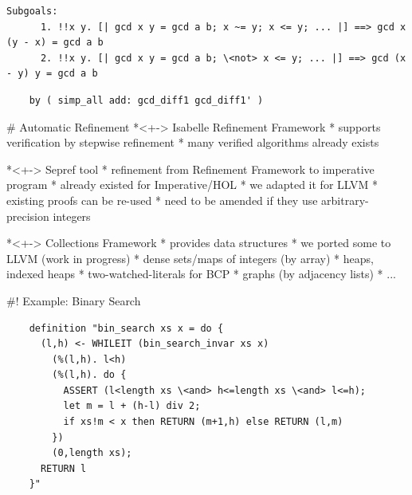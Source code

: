 \documentclass[fleqn]{beamer}
\begin{document}
  {\everymath{\color{darkgray}}
  \begin{lstlisting}[basicstyle=\color{darkgray}]
    Subgoals:
      1. !!x y. [| gcd x y = gcd a b; x ~= y; x <= y; ... |] ==> gcd x (y - x) = gcd a b
      2. !!x y. [| gcd x y = gcd a b; \<not> x <= y; ... |] ==> gcd (x - y) y = gcd a b
  \end{lstlisting}
  }
  \pause

  \begin{lstlisting}
    by ( simp_all add: gcd_diff1 gcd_diff1' )
  \end{lstlisting}

%

\renewcommand{\insertsectitle}{\color{red}{Frontend}}

# Automatic Refinement
  *<+-> Isabelle Refinement Framework
    * supports verification by stepwise refinement
    * many verified algorithms already exists

  *<+-> Sepref tool
    * refinement from Refinement Framework to imperative program
      * already existed for Imperative/HOL
      * we adapted it for LLVM
    * existing proofs can be re-used
      * need to be amended if they use arbitrary-precision integers

  *<+-> Collections Framework
    * provides data structures
    * we ported some to LLVM (work in progress)
      * dense sets/maps of integers (by array)
      * heaps, indexed heaps
      * two-watched-literals for BCP
      * graphs (by adjacency lists)
      * ...


%
%

#! Example: Binary Search
  \begin{lstlisting}
    definition "bin_search xs x = do {
      (l,h) <- WHILEIT (bin_search_invar xs x)
        (%(l,h). l<h)
        (%(l,h). do {
          ASSERT (l<length xs \<and> h<=length xs \<and> l<=h);
          let m = l + (h-l) div 2;
          if xs!m < x then RETURN (m+1,h) else RETURN (l,m)
        })
        (0,length xs);
      RETURN l
    }"
  \end{lstlisting}
  \pause
\end{document}
